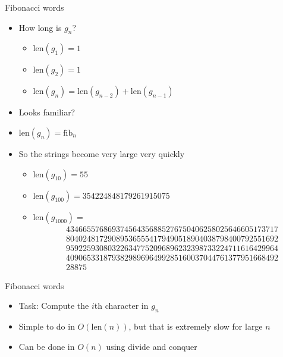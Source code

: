 \documentclass[12pt,t]{beamer}
\newcommand{\bi}{\begin{itemize}}
\newcommand{\ei}{\end{itemize}}
\begin{document}
\begin{frame}{Fibonacci words}
    \vspace{5pt}
    \bi
        \item How long is $g_n$?
            \bi
                \item $\mathrm{len}(g_1) = 1$
                \item $\mathrm{len}(g_2) = 1$
                \item $\mathrm{len}(g_n) = \mathrm{len}(g_{n-2}) + \mathrm{len}(g_{n-1})$
            \ei
        \vspace{5pt}
        \item Looks familiar?
        \vspace{2pt}
        \item $\mathrm{len}(g_n) = \mathrm{fib}_{n}$
        \vspace{10pt}
        \item So the strings become very large very quickly
            \bi
                \item $\mathrm{len}(g_{10}) = 55$
                \item $\mathrm{len}(g_{100}) = 354224848179261915075$
                \item $\mathrm{len}(g_{1000}) = $ \begin{align*}
                        &434665576869374564356885276750406258025646605173717\\
                        &804024817290895365554179490518904038798400792551692\\
                        &959225930803226347752096896232398733224711616429964\\
                        &409065331879382989696499285160037044761377951668492\\
                        &28875
                    \end{align*}

            \ei
    \ei
\end{frame}

\begin{frame}{Fibonacci words}
    \vspace{40pt}
    \bi
        \item Task: Compute the $i$th character in $g_{n}$
        \vspace{10pt}
        \item<2-> Simple to do in $O(\mathrm{len}(n))$, but that is extremely slow for large $n$
        \vspace{10pt}
        \item<3-> Can be done in $O(n)$ using divide and conquer
    \ei
\end{frame}
\end{document}
